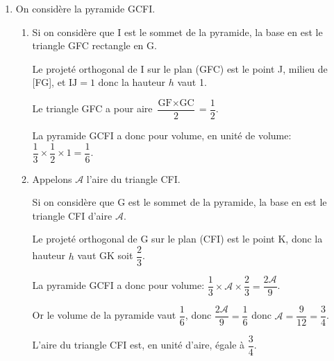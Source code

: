 \documentclass[10pt]{article}
\providecommand{\ds}{\displaystyle}
\begin{document}
\begin{enumerate}
\begin{enumerate}
Donc le projeté orthogonal K du point G sur le plan (CFI) a pour coordonnées $\left (\dfrac{7}{9}\;; \dfrac{5}{9}\;; \dfrac{5}{9} \right )$.
		\item La distance du point G au plan (CFI) est:
		
$\begin{gathered}\text{GK}= \ds\sqrt{(x_{\text K} - x_{\text G})^2 + (y_{\text K} - y_{\text G})^2 +(z_{\text K} - z_{\text G})^2 }
= \ds\sqrt{\left ( \frac{7}{9} - 1\right )^2 + \left ( \frac{5}{9} - 1\right )^2+\left ( \frac{5}{9} - 1\right )^2}\\
\phantom{\text{GK}}
= \ds\sqrt{\left ( -\frac{2}{9}\right )^2 + \left ( -\frac{4}{9}\right )^2+\left ( -\frac{4}{9}\right )^2}
=\ds\sqrt{\frac{4}{81} + \frac{16}{81} + \frac{16}{81}}
=\ds\sqrt{ \frac{36}{81}}
= \frac{6}{9}
= \frac23\end{gathered}$.
	\end{enumerate}
	
\item On considère la pyramide GCFI.







	\begin{enumerate}
		\item 
Si on considère que I est le sommet de la pyramide, la base en est le triangle GFC rectangle en G.

Le projeté orthogonal de I sur le plan (GFC) est le point J, milieu de [FG], et $\text{IJ}=1$ donc la hauteur $h$ vaut 1.

Le triangle GFC a pour aire $\dfrac{\text{GF}\times \text{GC}}{2} = \dfrac{1}{2}$.

La pyramide GCFI a donc pour volume, en unité de volume:  $\dfrac{1}{3}\times \dfrac{1}{2}\times 1 = \dfrac{1}{6}$.
		
		\item Appelons $\mathcal{A}$ l'aire du triangle CFI.
		
Si on considère que G est le sommet de la pyramide, la base en est le triangle CFI d'aire $\mathcal{A}$.

Le projeté orthogonal de G sur le plan (CFI) est le point K, donc la hauteur $h$ vaut GK soit $\dfrac{2}{3}$.

La pyramide GCFI a donc pour volume:  $\dfrac{1}{3}\times \mathcal{A}\times \dfrac{2}{3} = \dfrac{2\mathcal{A}}{9}$.

Or le volume de la pyramide vaut $\dfrac{1}{6}$, donc $\dfrac{2\mathcal{A}}{9} = \dfrac{1}{6}$ donc $\mathcal{A}=\dfrac{9}{12}=\dfrac{3}{4}$.

L'aire du triangle CFI est, en unité d'aire, égale à $\dfrac{3}{4}$.
		
	\end{enumerate}
\end{enumerate}
\end{document}
